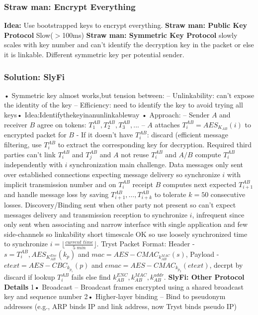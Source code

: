 \documentclass[9pt]{extarticle}
\begin{document}
\begin{multicols}{2}
\subsubsection{Straw man: Encrypt Everything}
\textbf{Idea:} Use bootstrapped keys to encrypt everything. \textbf{Straw man: Public Key Protocol} Slow($>$100ms) \textbf{Straw man: Symmetric Key Protocol} slowly scales with key number and can’t identify the decryption key in the packet or else it is linkable. Different symmetric key per potential sender. 


\subsubsection{Solution: SlyFi}
• Symmetric key almost works,but tension between: – Unlinkability: can’t expose the identity of the key – Efficiency: need to identify the key to avoid trying all keys• Idea:Identifythekeyinanunlinkableway • Approach:
– Sender $A$ and receiver $B$ agree on tokens: $T_1^{AB}, T_2^{AB}, T_3^{AB}, ...$ – $A$ attaches $T_i^{AB}=AES_{K_{AB}}(i)$ to encrypted packet for $B$ - If it doesn’t have $T_i^{AB}$: discard (efficient message filtering, use $T_i^{AB}$ to extract the corresponding key for decryption. Required third parties can't link $T_i^{AB}$ and $T_j^{AB}$ and $A$ not reuse $T_i^{AB}$ and $A/B$ compute $T_i^{AB}$ independently with $i$ synchronization main challenge. Data messages only sent over established connections expecting message delivery so synchronize $i$ with implicit transmission number and on $T_i^{AB}$ receipt $B$ computes next expected $T_{i+1}^{AB}$ and handle message loss by saving $T_{i+1}^{AB},\dots,T_{i+k}^{AB}$ to tolerate $k=50$ consecutive losses.  Discovery/Binding sent when other party not present so can’t expect messages delivery and transmission reception to synchronize $i$, infrequent since only sent when associating and narrow interface with single application and few side-channels so linkability short timescale OK so use loosely synchronized time to synchronize $i=\lfloor\frac{\textit{current time}}{5\textit{ min}}\rfloor$. Tryst Packet Format: Header - $s={T_i^{AB}, AES_{K_{AB}^{Enc}}(k_p)}$ and $mac=AES-CMAC_{k_{AB}^{MAC}}(s)$, Payload - $etext=AES-CBC_{k_{p_1}}(p)$ and $emac=AES-CMAC_{k_{p_2}}(etext)$, decrpt by discard if lookup $T_i^{AB}$ fails else find $k_{AB}^{ENC},k_{AB}^{MAC},k_{AB}^{addr}$. \textbf{SlyFi: Other Protocol Details} 1• Broadcast
– Broadcast frames encrypted using a shared
broadcast key and sequence number 2• Higher-layer binding – Bind to pseudonym addresses (e.g., ARP binds IP and link address, now Tryst binds pseudo IP)

\end{multicols}
\end{document}

